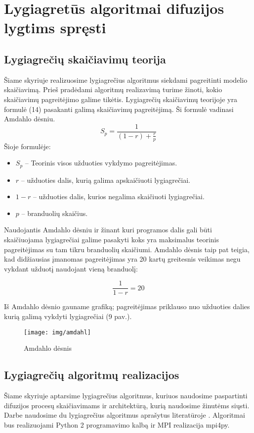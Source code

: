 \documentclass{VUMIFPSkursinis}
\begin{document}
\pagebreak

\section{Lygiagretūs algoritmai difuzijos lygtims spręsti}
\subsection{Lygiagrečių skaičiavimų teorija}
Šiame skyriuje realizuosime lygiagrečius algoritmus siekdami pagreitinti modelio skaičiavimą.
Prieš pradėdami algoritmų realizavimą turime žinoti, kokio skaičiavimų pagreitėjimo galime tikėtis.
Lygiagrečių skaičiavimų teorijoje yra formulė (14) pasakanti galimą skaičiavimų pagreitėjimą.
Ši formulė vadinasi Amdahlo dėsniu.
\begin{equation}
S_p = \frac{1}{(1 - r) + \frac{r}{p}}
\end{equation}
Šioje formulėje:
\begin{itemize}
\item{$S_p$ – Teorinis visos užduoties vykdymo pagreitėjimas.}
\item{$r$ – užduoties dalis, kurią galima apskaičiuoti lygiagrečiai.}
\item{$1-r$ – užduoties dalis, kurios negalima skaičiuoti lygiagrečiai.}
\item{$p$ – branduolių skaičius.}
\end{itemize}

Naudojantis Amdahlo dėsniu ir žinant kuri programos dalis gali būti skaičiuojama lygiagrečiai galime pasakyti koks yra maksimalus teorinis pagreitėjimas su tam tikru branduolių skaičiumi.
Amdahlo dėsnis taip pat teigia, kad didžiausias įmanomas pagreitėjimas yra 20 kartų greitesnis veikimas negu vykdant užduotį naudojant vieną branduolį:

\begin{equation}
\frac{1}{1-r} = 20 
\end{equation}

Iš Amdahlo dėsnio gauname grafiką; pagreitėjimas priklauso nuo užduoties dalies kurią galimą vykdyti lygiagrečiai (9 pav.).
\begin{figure}[H]
\centering
\texttt{[image: img/amdahl]}
\caption{Amdahlo dėsnis} %
\label{img:text}
\end{figure}

\subsection{Lygiagrečių algoritmų realizacijos}
Šiame skyriuje aptarsime lygiagrečius algoritmus, kuriuos naudosime paspartinti difuzijos procesų skaičiavimams ir architektūrą, kurią naudosime žinutėms siųsti.
Darbe naudosime du lygiagrečius algoritmus aprašytus literatūroje \cite{Lygeg}.
Algoritmai bus realizuojami Python 2 programavimo kalbą ir MPI realizacija mpi4py.
\end{document}
